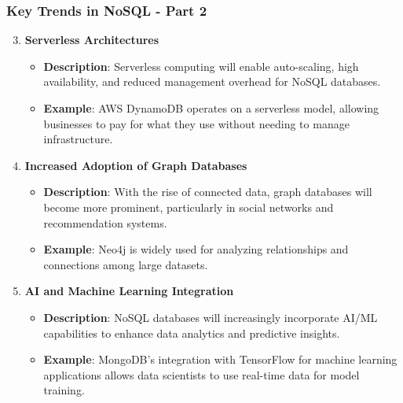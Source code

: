\documentclass[aspectratio=169]{beamer}
\begin{document}
\begin{frame}[fragile]
    \frametitle{Key Trends in NoSQL - Part 2}
    \begin{enumerate}
        \setcounter{enumi}{2} %
        \item \textbf{Serverless Architectures}
        \begin{itemize}
            \item \textbf{Description}: Serverless computing will enable auto-scaling, high availability, and reduced management overhead for NoSQL databases.
            \item \textbf{Example}: AWS DynamoDB operates on a serverless model, allowing businesses to pay for what they use without needing to manage infrastructure.
        \end{itemize}
        
        \item \textbf{Increased Adoption of Graph Databases}
        \begin{itemize}
            \item \textbf{Description}: With the rise of connected data, graph databases will become more prominent, particularly in social networks and recommendation systems.
            \item \textbf{Example}: Neo4j is widely used for analyzing relationships and connections among large datasets.
        \end{itemize}
        
        \item \textbf{AI and Machine Learning Integration}
        \begin{itemize}
            \item \textbf{Description}: NoSQL databases will increasingly incorporate AI/ML capabilities to enhance data analytics and predictive insights.
            \item \textbf{Example}: MongoDB's integration with TensorFlow for machine learning applications allows data scientists to use real-time data for model training.
        \end{itemize}
    \end{enumerate}
\end{frame}
\end{document}
